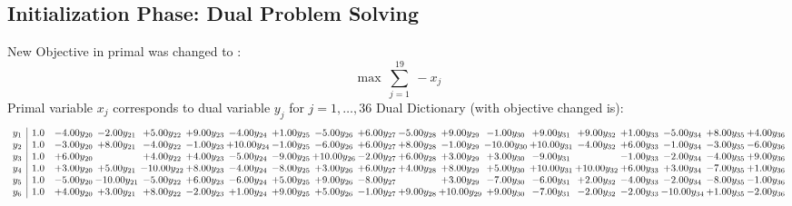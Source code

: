 \documentclass[9pt]{article}
\begin{document}
\subsection{Initialization Phase: Dual Problem Solving}
New Objective in primal was changed to : \[ \max\ \sum_{j=1}^{19}\ - x_j \] 
Primal variable $x_j$ corresponds to dual variable $y_j$ for $j = 1,\ldots,36$
Dual Dictionary (with objective changed is): 
\[\begin{array}{c| c c@{\hskip 2pt} c@{\hskip 2pt} c@{\hskip 2pt} c@{\hskip 2pt} c@{\hskip 2pt} c@{\hskip 2pt} c@{\hskip 2pt} c@{\hskip 2pt} c@{\hskip 2pt} c@{\hskip 2pt} c@{\hskip 2pt} c@{\hskip 2pt} c@{\hskip 2pt} c@{\hskip 2pt} c@{\hskip 2pt} c@{\hskip 2pt} c@{\hskip 2pt} }
 y_{1}   &  1.0 & -4.00 y_{20} & -2.00 y_{21} & +  5.00 y_{22} & +  9.00 y_{23} & -4.00 y_{24} & +  1.00 y_{25} & -5.00 y_{26} & +  6.00 y_{27} & -5.00 y_{28} & +  9.00 y_{29} & -1.00 y_{30} & +  9.00 y_{31} & +  9.00 y_{32} & +  1.00 y_{33} & -5.00 y_{34} & +  8.00 y_{35} & +  4.00 y_{36}\\
 y_{2}   &  1.0 & -3.00 y_{20} & +  8.00 y_{21} & -4.00 y_{22} & -1.00 y_{23} & + 10.00 y_{24} & -1.00 y_{25} & -6.00 y_{26} & +  6.00 y_{27} & +  8.00 y_{28} & -1.00 y_{29} & -10.00 y_{30} & + 10.00 y_{31} & -4.00 y_{32} & +  6.00 y_{33} & -1.00 y_{34} & -3.00 y_{35} & -6.00 y_{36}\\
 y_{3}   &  1.0 & +  6.00 y_{20} &   & +  4.00 y_{22} & +  4.00 y_{23} & -5.00 y_{24} & -9.00 y_{25} & + 10.00 y_{26} & -2.00 y_{27} & +  6.00 y_{28} & +  3.00 y_{29} & +  3.00 y_{30} & -9.00 y_{31} &   & -1.00 y_{33} & -2.00 y_{34} & -4.00 y_{35} & +  9.00 y_{36}\\
 y_{4}   &  1.0 & +  3.00 y_{20} & +  5.00 y_{21} & -10.00 y_{22} & +  8.00 y_{23} & -4.00 y_{24} & -8.00 y_{25} & +  3.00 y_{26} & +  6.00 y_{27} & +  4.00 y_{28} & +  8.00 y_{29} & +  5.00 y_{30} & + 10.00 y_{31} & + 10.00 y_{32} & +  6.00 y_{33} & +  3.00 y_{34} & -7.00 y_{35} & +  1.00 y_{36}\\
 y_{5}   &  1.0 & -5.00 y_{20} & -10.00 y_{21} & -5.00 y_{22} & +  6.00 y_{23} & -6.00 y_{24} & +  5.00 y_{25} & +  9.00 y_{26} & -8.00 y_{27} &   & +  3.00 y_{29} & -7.00 y_{30} & -6.00 y_{31} & +  2.00 y_{32} & -4.00 y_{33} & -2.00 y_{34} & -8.00 y_{35} & -1.00 y_{36}\\
 y_{6}   &  1.0 & +  4.00 y_{20} & +  3.00 y_{21} & +  8.00 y_{22} & -2.00 y_{23} & +  1.00 y_{24} & +  9.00 y_{25} & +  5.00 y_{26} & -1.00 y_{27} & +  9.00 y_{28} & + 10.00 y_{29} & +  9.00 y_{30} & -7.00 y_{31} & -2.00 y_{32} & -2.00 y_{33} & -10.00 y_{34} & +  1.00 y_{35} & -2.00 y_{36}\\

\end{array}\]
\end{document}
